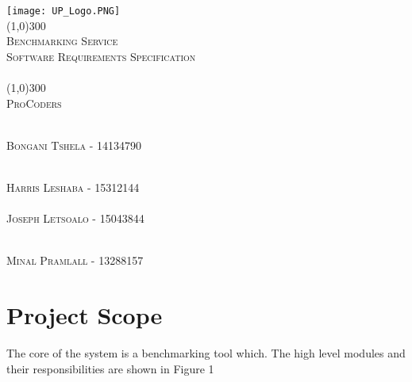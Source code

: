 \documentclass[runningheads,a4paper]{article}
\begin{document}
	
\begin{titlepage}
	\begin{center}
		\texttt{[image: UP\_Logo.PNG]}  \\
		[1cm]
		\line(1,0){300} \\
		[0.3cm]
		\textsc{\Large
			Benchmarking Service\\
			Software Requirements Specification\\
			\hfill
		}\\
		[0.1cm]
		\line(1,0){300} \\
		[0.7cm]
		\textsc{\Large
			ProCoders
		} \\
	\end{center}
	
	\begin{center}
		\begin{centre}
			\textsc{\large\\
				Bongani Tshela - 14134790\\ 
			}
		
				\textsc{\large\\
					Harris Leshaba - 15312144\\ 
				}
			\textsc{\large\\
				Joseph Letsoalo - 15043844\\ 
			}
			
			\textsc{\large\\
				Minal Pramlall - 13288157\\ 
			}
			

            

		\end{centre}
		
		
		
	\end{center}
\end{titlepage}

\begingroup

\tableofcontents
{}
\endgroup
\newpage
\section{Project Scope}
The core of the system is a benchmarking tool which. The high level modules and their responsibilities are
shown in Figure 1
\end{document}

